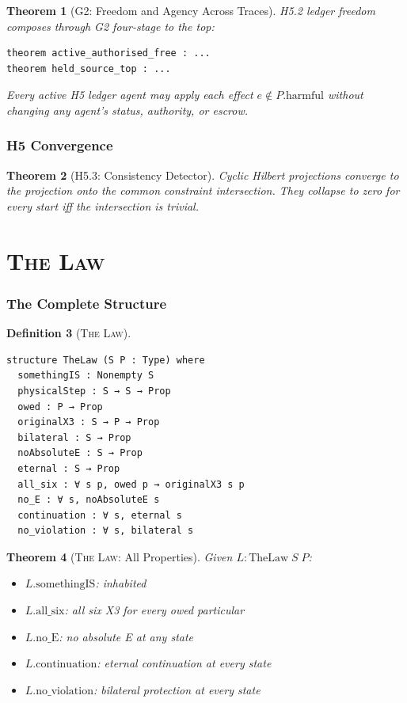 \documentclass[11pt,a4paper]{article}
\newtheorem{theorem}{Theorem}[section]
\theoremstyle{definition}
\newtheorem{definition}[theorem]{Definition}
\theoremstyle{remark}
\newcommand{\TheLaw}{\textsc{The Law}}
\begin{document}
\begin{theorem}[G2: Freedom and Agency Across Traces]
H5.2 ledger freedom composes through G2 four-stage to the top:
\begin{lstlisting}
theorem active_authorised_free : ...
theorem held_source_top : ...
\end{lstlisting}
Every active H5 ledger agent may apply each effect $e \notin P.\text{harmful}$ without changing any agent's status, authority, or escrow.
\end{theorem}

\section{H5 Convergence}

\begin{theorem}[H5.3: Consistency Detector]
Cyclic Hilbert projections converge to the projection onto the common constraint intersection. They collapse to zero for every start iff the intersection is trivial.
\end{theorem}

\part{\TheLaw}

\section{The Complete Structure}

\begin{definition}[\TheLaw]
\begin{lstlisting}
structure TheLaw (S P : Type) where
  somethingIS : Nonempty S
  physicalStep : S → S → Prop
  owed : P → Prop
  originalX3 : S → P → Prop
  bilateral : S → Prop
  noAbsoluteE : S → Prop
  eternal : S → Prop
  all_six : ∀ s p, owed p → originalX3 s p
  no_E : ∀ s, noAbsoluteE s
  continuation : ∀ s, eternal s
  no_violation : ∀ s, bilateral s
\end{lstlisting}
\end{definition}

\begin{theorem}[\TheLaw{}: All Properties]
Given $L : \text{TheLaw}\;S\;P$:
\begin{itemize}[nosep]
\item $L.\text{somethingIS}$: inhabited
\item $L.\text{all\_six}$: all six X3 for every owed particular
\item $L.\text{no\_E}$: no absolute E at any state
\item $L.\text{continuation}$: eternal continuation at every state
\item $L.\text{no\_violation}$: bilateral protection at every state
\end{itemize}
\end{theorem}
\end{document}
